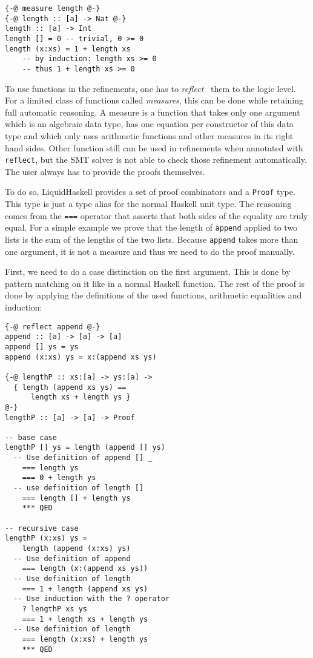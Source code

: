 \documentclass[sigplan,screen,review,anonymous]{acmart}
\begin{document}
\begin{lstlisting}
{-@ measure length @-}
{-@ length :: [a] -> Nat @-}
length :: [a] -> Int
length [] = 0 -- trivial, 0 >= 0
length (x:xs) = 1 + length xs
    -- by induction: length xs >= 0
    -- thus 1 + length xs >= 0
\end{lstlisting}

To use functions in the refinements, one has to \textit{reflect}~\cite{reflection} them to the logic level. For a limited class of functions called \textit{measures}, this can be done while retaining full automatic reasoning. A measure is a function that takes only one argument which is an algebraic data type, has one equation per constructor of this data type and which only uses arithmetic functions and other measures in its right hand sides. Other function still can be used in refinements when annotated with \texttt{reflect}, but the SMT solver is not able to check those refinement automatically. The user always has to provide the proofs themselves.

To do so, LiquidHaskell provides a set of proof combinators and a \texttt{Proof} type. This type is just a type alias for the normal Haskell unit type. The reasoning comes from the \texttt{===} operator that asserts that both sides of the equality are truly equal. For a simple example we prove that the length of \texttt{append} applied to two lists is the sum of the lengths of the two lists. Because \texttt{append} takes more than one argument, it is not a measure and thus we need to do the proof manually.

First, we need to do a case distinction on the first argument. This is done by pattern matching on it like in a normal Haskell function. The rest of the proof is done by applying the definitions of the used functions, arithmetic equalities and induction:

\begin{lstlisting}
{-@ reflect append @-}
append :: [a] -> [a] -> [a]
append [] ys = ys
append (x:xs) ys = x:(append xs ys)

{-@ lengthP :: xs:[a] -> ys:[a] ->
  { length (append xs ys) ==
      length xs + length ys }
@-}
lengthP :: [a] -> [a] -> Proof

-- base case
lengthP [] ys = length (append [] ys)
  -- Use definition of append [] _
    === length ys
    === 0 + length ys
  -- use definition of length []
    === length [] + length ys
    *** QED

-- recursive case
lengthP (x:xs) ys =
    length (append (x:xs) ys)
  -- Use definition of append
    === length (x:(append xs ys))
  -- Use definition of length
    === 1 + length (append xs ys)
  -- Use induction with the ? operator
    ? lengthP xs ys
    === 1 + length xs + length ys
  -- Use definition of length
    === length (x:xs) + length ys
    *** QED
\end{lstlisting}
\end{document}
